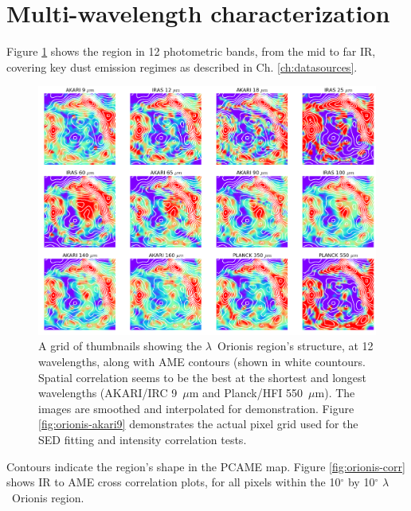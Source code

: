 		\section{Multi-wavelength characterization}
			Figure \ref{fig:orionis-img} shows the region in 12 photometric bands, from the mid to far IR, covering key dust emission regimes as described in Ch. \ref{ch:datasources}.
                \begin{figure}
                  \includegraphics[width=\textwidth]{../Plots/lOrionis_grid_img.png}
                  \centering
                  \caption{A grid of thumbnails showing the $\lambda$~Orionis region's structure, at 12 wavelengths, along with AME contours (shown in white countours. Spatial correlation seems to be the best at the shortest and longest wavelengths (AKARI/IRC 9~$\mu$m and Planck/HFI 550~$\mu$m). The images are smoothed and interpolated for demonstration. Figure \ref{fig:orionis-akari9} demonstrates the actual pixel grid used for the SED fitting and intensity correlation tests.}
                  \label{fig:orionis-img}
                \end{figure}
			Contours indicate the region's shape in the PCAME map. Figure \ref{fig:orionis-corr} shows IR to AME cross correlation plots, for all pixels within the 10$^{\circ}$ by 10$^{\circ}$ $\lambda$~Orionis region.
